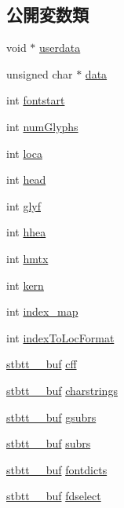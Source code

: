 \subsection*{公開変数類}
\begin{DoxyCompactItemize}
\item 
void $\ast$ \mbox{\hyperlink{structstbtt__fontinfo_a9c81078df96a7a3f730137151efab285}{userdata}}
\item 
unsigned char $\ast$ \mbox{\hyperlink{structstbtt__fontinfo_af348db379cf0e0e71a68603d00501d41}{data}}
\item 
int \mbox{\hyperlink{structstbtt__fontinfo_a139234d825b585afa27748a1f3d10c7d}{fontstart}}
\item 
int \mbox{\hyperlink{structstbtt__fontinfo_a60ad8301a98eb7cd91472ce846d9080d}{num\+Glyphs}}
\item 
int \mbox{\hyperlink{structstbtt__fontinfo_a15344195b181b50bde4f59ae7ca248c0}{loca}}
\item 
int \mbox{\hyperlink{structstbtt__fontinfo_ab76ed2f4cbd8fcbd8465ca5f88e7e2b9}{head}}
\item 
int \mbox{\hyperlink{structstbtt__fontinfo_a5de2129e0a415748920f6aa10ceee6e5}{glyf}}
\item 
int \mbox{\hyperlink{structstbtt__fontinfo_a91b82ae03d68892eb7f3fbd3a8b990e5}{hhea}}
\item 
int \mbox{\hyperlink{structstbtt__fontinfo_aebf42701e99b88d07a59bf99cb84b9a1}{hmtx}}
\item 
int \mbox{\hyperlink{structstbtt__fontinfo_a57cc83512daea60e97ed49354d634d37}{kern}}
\item 
int \mbox{\hyperlink{structstbtt__fontinfo_a0b95e3ac0c397b72b7696ce6696eb189}{index\+\_\+map}}
\item 
int \mbox{\hyperlink{structstbtt__fontinfo_a5fa117a7ef058111a70a5b0b87d220f4}{index\+To\+Loc\+Format}}
\item 
\mbox{\hyperlink{structstbtt____buf}{stbtt\+\_\+\+\_\+buf}} \mbox{\hyperlink{structstbtt__fontinfo_a6031b4bda94aa2b5ff07ef5d626a15a4}{cff}}
\item 
\mbox{\hyperlink{structstbtt____buf}{stbtt\+\_\+\+\_\+buf}} \mbox{\hyperlink{structstbtt__fontinfo_aaf04a69f8dd4b6a8bed4191b57145082}{charstrings}}
\item 
\mbox{\hyperlink{structstbtt____buf}{stbtt\+\_\+\+\_\+buf}} \mbox{\hyperlink{structstbtt__fontinfo_afc5bfc4a52ad0e3879f0f81a372da7fb}{gsubrs}}
\item 
\mbox{\hyperlink{structstbtt____buf}{stbtt\+\_\+\+\_\+buf}} \mbox{\hyperlink{structstbtt__fontinfo_aebc496bb1c001a8a90e0e66da16107d2}{subrs}}
\item 
\mbox{\hyperlink{structstbtt____buf}{stbtt\+\_\+\+\_\+buf}} \mbox{\hyperlink{structstbtt__fontinfo_a966c70ac9548a02fff558846fbce3677}{fontdicts}}
\item 
\mbox{\hyperlink{structstbtt____buf}{stbtt\+\_\+\+\_\+buf}} \mbox{\hyperlink{structstbtt__fontinfo_a4e06b1c29295a9aba529105e88fe1d71}{fdselect}}
\end{DoxyCompactItemize}


